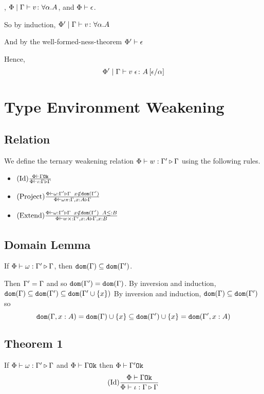 {    \bi, $\Phi\mid\Gamma \vdash v \colon \forall \alpha. A$, and $\Phi\vdash \epsilon$.

    So by induction, $\Phi'\mid\Gamma \vdash v \colon \forall \alpha. A$

    And by the well-formed-ness-theorem $\Phi'\vdash \epsilon$

    Hence, \begin{equation}
        \Phi'\mid\Gamma \vdash v\;\epsilon \colon A\left[\epsilon / \alpha\right]
    \end{equation}

    \section{Type Environment Weakening}
    \subsection{Relation}
    We define the ternary weakening relation $\Phi\vdash w : \Gamma' \triangleright \Gamma$ using the following rules.


    \begin{itemize}
        \item $(\text{Id}) \frac{\Phi\vdash \Gamma \texttt{Ok}}{\Phi\vdash \iota : \Gamma \triangleright \Gamma}$
        \item $(\text{Project}) \frac{\Phi\vdash \omega : \Gamma' \triangleright \Gamma\;\; x \notin \texttt{dom}(\Gamma')}{\Phi\vdash \omega \pi : \Gamma, x: A \triangleright \Gamma}$
        \item $(\text{Extend}) \frac{\Phi\vdash \omega : \Gamma' \triangleright \Gamma\;\; x \notin \texttt{dom}(\Gamma')\;\; A \leq: B}{\Phi\vdash w \times : \Gamma', x: A \triangleright \Gamma, x: B}$
    \end{itemize}

    \subsection{Domain Lemma}
    If $\Phi\vdash \omega : \Gamma' \triangleright \Gamma$, then $\texttt{dom}(\Gamma)\subseteq \texttt{dom}(\Gamma')$.

    \proof
    Then $\Gamma' = \Gamma$ and so $\texttt{dom}(\Gamma') = \texttt{dom}(\Gamma)$.
    By inversion and induction, $\texttt{dom}(\Gamma)\subseteq\texttt{dom}(\Gamma')\subseteq\texttt{dom}(\Gamma'\cup\left\{x\right\})$
    By inversion and induction, $\texttt{dom}(\Gamma)\subseteq\texttt{dom}(\Gamma')$ so 
    $$\texttt{dom}(\Gamma, x: A) = \texttt{dom}(\Gamma)\cup\left\{x\right\} \subseteq\texttt{dom}(\Gamma')\cup\left\{x\right\} = \texttt{dom}(\Gamma',x:A)$$
    \subsection{Theorem 1}
    If $\Phi\vdash \omega : \Gamma' \triangleright \Gamma$ and $\Phi\vdash \Gamma \texttt{Ok}$ then $\Phi\vdash \Gamma' \texttt{Ok}$
    \proof
    $$(\text{Id}) \frac{\Phi\vdash \Gamma \texttt{Ok}}{\Phi\vdash \iota : \Gamma \triangleright \Gamma}$$

}
